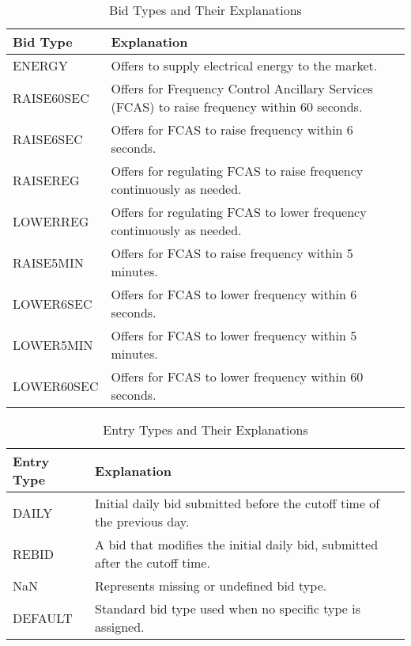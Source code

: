 \documentclass{article}
\begin{document}
\begin{table}[ht]
\centering
\caption{Bid Types and Their Explanations}
\label{tab:bid_types}
\begin{tabularx}{\textwidth}{|l|X|}
\hline
\textbf{Bid Type} & \textbf{Explanation} \\
\hline
ENERGY & Offers to supply electrical energy to the market. \\
\hline
RAISE60SEC & Offers for Frequency Control Ancillary Services (FCAS) to raise frequency within 60 seconds. \\
\hline
RAISE6SEC & Offers for FCAS to raise frequency within 6 seconds. \\
\hline
RAISEREG & Offers for regulating FCAS to raise frequency continuously as needed. \\
\hline
LOWERREG & Offers for regulating FCAS to lower frequency continuously as needed. \\
\hline
RAISE5MIN & Offers for FCAS to raise frequency within 5 minutes. \\
\hline
LOWER6SEC & Offers for FCAS to lower frequency within 6 seconds. \\
\hline
LOWER5MIN & Offers for FCAS to lower frequency within 5 minutes. \\
\hline
LOWER60SEC & Offers for FCAS to lower frequency within 60 seconds. \\
\hline
\end{tabularx}
\end{table}

\begin{table}[ht]
\centering
\caption{Entry Types and Their Explanations}
\label{tab:entry_types}
\begin{tabularx}{\textwidth}{|l|X|}
\hline
\textbf{Entry Type} & \textbf{Explanation} \\
\hline
DAILY & Initial daily bid submitted before the cutoff time of the previous day. \\
\hline
REBID & A bid that modifies the initial daily bid, submitted after the cutoff time. \\
\hline
NaN & Represents missing or undefined bid type. \\
\hline
DEFAULT & Standard bid type used when no specific type is assigned. \\
\hline
\end{tabularx}
\end{table}
\end{document}
